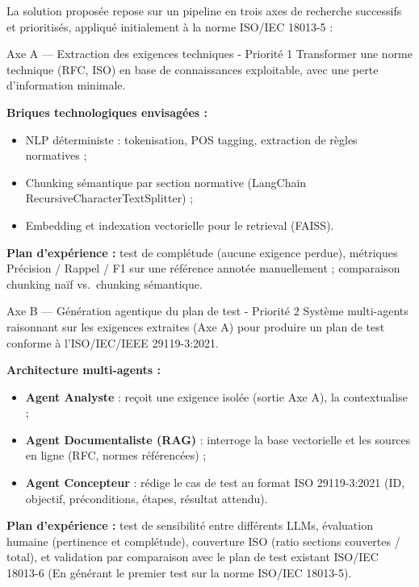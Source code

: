 \documentclass[12pt, a4paper]{article}
\begin{document}
La solution proposée repose sur un pipeline en trois axes de recherche successifs et
prioritisés, appliqué initialement à la norme ISO/IEC 18013-5 :

\begin{axebox}[axeA]{Axe A — Extraction des exigences techniques - Priorité 1}
Transformer une norme technique (RFC, ISO) en base de connaissances exploitable, avec
une perte d'information minimale.

\medskip
\textbf{Briques technologiques envisagées :}
\begin{itemize}
  \item NLP déterministe : tokenisation, POS tagging, extraction de règles normatives ;
  \item Chunking sémantique par section normative (LangChain RecursiveCharacterTextSplitter) ;
  \item Embedding et indexation vectorielle pour le retrieval (FAISS).
\end{itemize}

\medskip
\textbf{Plan d'expérience :} test de complétude (aucune exigence perdue), métriques
Précision / Rappel / F1 sur une référence annotée manuellement ; comparaison chunking
naïf vs.\ chunking sémantique.
\end{axebox}

\vspace{0.8em}

\begin{axebox}[axeB]{Axe B — Génération agentique du plan de test - Priorité 2}
Système multi-agents raisonnant sur les exigences extraites (Axe A) pour produire un
plan de test conforme à l'ISO/IEC/IEEE 29119-3:2021.

\medskip
\textbf{Architecture multi-agents :}
\begin{itemize}
  \item \textbf{Agent Analyste} : reçoit une exigence isolée (sortie Axe A), la contextualise ;
  \item \textbf{Agent Documentaliste (RAG)} : interroge la base vectorielle et les sources
    en ligne (RFC, normes référencées) ;
  \item \textbf{Agent Concepteur} : rédige le cas de test au format ISO 29119-3:2021
    (ID, objectif, préconditions, étapes, résultat attendu).
\end{itemize}

\medskip
\textbf{Plan d'expérience :} test de sensibilité entre différents LLMs, évaluation
humaine (pertinence et complétude), couverture ISO (ratio sections couvertes / total),
et validation par comparaison avec le plan de test existant ISO/IEC 18013-6 (En générant le premier test sur la norme ISO/IEC 18013-5).
\end{axebox}
\end{document}
